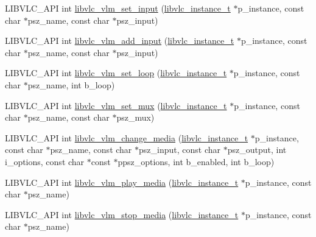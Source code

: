 \begin{DoxyCompactItemize}
\item 
L\+I\+B\+V\+L\+C\+\_\+\+A\+PI int \hyperlink{group__libvlc__vlm_ga3bffdef04ccd357ff6b807dd55a32df9}{libvlc\+\_\+vlm\+\_\+set\+\_\+input} (\hyperlink{group__libvlc__core_ga316d739a80da4678206c79f4d6c2e284}{libvlc\+\_\+instance\+\_\+t} $\ast$p\+\_\+instance, const char $\ast$psz\+\_\+name, const char $\ast$psz\+\_\+input)
\item 
L\+I\+B\+V\+L\+C\+\_\+\+A\+PI int \hyperlink{group__libvlc__vlm_ga5fa0df8fe9c5ea1dc7a4e119b74641c0}{libvlc\+\_\+vlm\+\_\+add\+\_\+input} (\hyperlink{group__libvlc__core_ga316d739a80da4678206c79f4d6c2e284}{libvlc\+\_\+instance\+\_\+t} $\ast$p\+\_\+instance, const char $\ast$psz\+\_\+name, const char $\ast$psz\+\_\+input)
\item 
L\+I\+B\+V\+L\+C\+\_\+\+A\+PI int \hyperlink{group__libvlc__vlm_gaddaf297839d6bfcdd9902325ee9dee1d}{libvlc\+\_\+vlm\+\_\+set\+\_\+loop} (\hyperlink{group__libvlc__core_ga316d739a80da4678206c79f4d6c2e284}{libvlc\+\_\+instance\+\_\+t} $\ast$p\+\_\+instance, const char $\ast$psz\+\_\+name, int b\+\_\+loop)
\item 
L\+I\+B\+V\+L\+C\+\_\+\+A\+PI int \hyperlink{group__libvlc__vlm_ga55ef9e3e50d2e020e3a8ac60e3cddc92}{libvlc\+\_\+vlm\+\_\+set\+\_\+mux} (\hyperlink{group__libvlc__core_ga316d739a80da4678206c79f4d6c2e284}{libvlc\+\_\+instance\+\_\+t} $\ast$p\+\_\+instance, const char $\ast$psz\+\_\+name, const char $\ast$psz\+\_\+mux)
\item 
L\+I\+B\+V\+L\+C\+\_\+\+A\+PI int \hyperlink{group__libvlc__vlm_ga8b6b44cfe9083fe54cef6bf922d8a2ce}{libvlc\+\_\+vlm\+\_\+change\+\_\+media} (\hyperlink{group__libvlc__core_ga316d739a80da4678206c79f4d6c2e284}{libvlc\+\_\+instance\+\_\+t} $\ast$p\+\_\+instance, const char $\ast$psz\+\_\+name, const char $\ast$psz\+\_\+input, const char $\ast$psz\+\_\+output, int i\+\_\+options, const char $\ast$const $\ast$ppsz\+\_\+options, int b\+\_\+enabled, int b\+\_\+loop)
\item 
L\+I\+B\+V\+L\+C\+\_\+\+A\+PI int \hyperlink{group__libvlc__vlm_gaa9a8c40e7be3bf755e29a53135b00635}{libvlc\+\_\+vlm\+\_\+play\+\_\+media} (\hyperlink{group__libvlc__core_ga316d739a80da4678206c79f4d6c2e284}{libvlc\+\_\+instance\+\_\+t} $\ast$p\+\_\+instance, const char $\ast$psz\+\_\+name)
\item 
L\+I\+B\+V\+L\+C\+\_\+\+A\+PI int \hyperlink{group__libvlc__vlm_gad1ad823e28542b8e76c4454312cc3566}{libvlc\+\_\+vlm\+\_\+stop\+\_\+media} (\hyperlink{group__libvlc__core_ga316d739a80da4678206c79f4d6c2e284}{libvlc\+\_\+instance\+\_\+t} $\ast$p\+\_\+instance, const char $\ast$psz\+\_\+name)

\end{DoxyCompactItemize}
